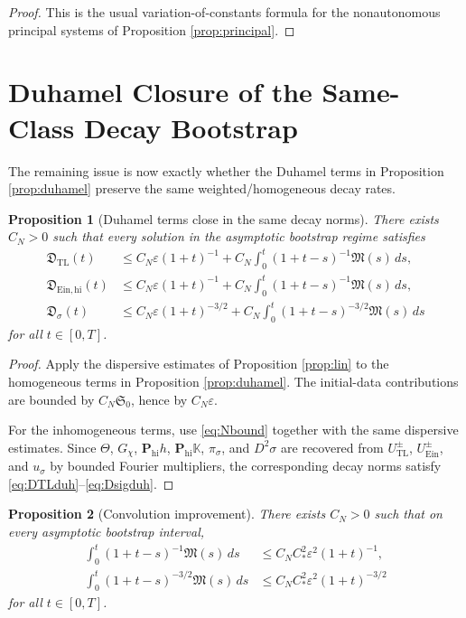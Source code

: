 \documentclass[11pt]{article}
\newtheorem{proposition}{Proposition}
\begin{document}
\begin{proof}
This is the usual variation-of-constants formula for the nonautonomous principal systems of Proposition \ref{prop:principal}.
\end{proof}

\section{Duhamel Closure of the Same-Class Decay Bootstrap}

The remaining issue is now exactly whether the Duhamel terms in Proposition \ref{prop:duhamel} preserve the same weighted/homogeneous decay rates.

\begin{proposition}[Duhamel terms close in the same decay norms]
\label{prop:close}
There exists \(C_N>0\) such that every solution in the asymptotic bootstrap regime satisfies
\begin{align}
\mathfrak D_{\mathrm{TL}}(t)
&\le
C_N\varepsilon(1+t)^{-1}
+ C_N\int_0^t (1+t-s)^{-1}\mathfrak M(s)\,ds,
\label{eq:DTLduh}
\\
\mathfrak D_{\mathrm{Ein,hi}}(t)
&\le
C_N\varepsilon(1+t)^{-1}
+ C_N\int_0^t (1+t-s)^{-1}\mathfrak M(s)\,ds,
\label{eq:DEinduh}
\\
\mathfrak D_\sigma(t)
&\le
C_N\varepsilon(1+t)^{-3/2}
+ C_N\int_0^t (1+t-s)^{-3/2}\mathfrak M(s)\,ds
\label{eq:Dsigduh}
\end{align}
for all \(t\in[0,T]\).
\end{proposition}

\begin{proof}
Apply the dispersive estimates of Proposition \ref{prop:lin} to the homogeneous terms in Proposition \ref{prop:duhamel}. The initial-data contributions are bounded by \(C_N\mathfrak S_0\), hence by \(C_N\varepsilon\).

For the inhomogeneous terms, use \eqref{eq:Nbound} together with the same dispersive estimates. Since \(\Theta\), \(G_\chi\), \(\mathbf P_{\mathrm{hi}}h\), \(\mathbf P_{\mathrm{hi}}\mathbb K\), \(\pi_\sigma\), and \(D^2\sigma\) are recovered from \(U_{\mathrm{TL}}^\pm\), \(U_{\mathrm{Ein}}^\pm\), and \(u_\sigma\) by bounded Fourier multipliers, the corresponding decay norms satisfy \eqref{eq:DTLduh}--\eqref{eq:Dsigduh}.
\end{proof}

\begin{proposition}[Convolution improvement]
\label{prop:conv}
There exists \(C_N>0\) such that on every asymptotic bootstrap interval,
\begin{align}
\int_0^t (1+t-s)^{-1}\mathfrak M(s)\,ds
&\le
C_NC_\ast^2\varepsilon^2(1+t)^{-1},
\label{eq:waveconv}
\\
\int_0^t (1+t-s)^{-3/2}\mathfrak M(s)\,ds
&\le
C_NC_\ast^2\varepsilon^2(1+t)^{-3/2}
\label{eq:schrconv}
\end{align}
for all \(t\in[0,T]\).
\end{proposition}
\end{document}
